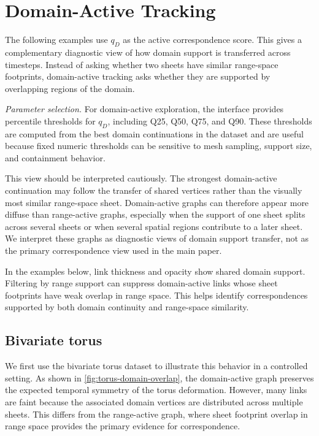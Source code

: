 \documentclass[review]{vgtc}
\begin{document}
\section{Domain-Active Tracking}

The following examples use $q_D$ as the active correspondence score. This gives a complementary diagnostic view of how domain support is transferred across timesteps. Instead of asking whether two sheets have similar range-space footprints, domain-active tracking asks whether they are supported by overlapping regions of the domain.

\emph{Parameter selection.} For domain-active exploration, the interface provides percentile thresholds for $q_D$, including Q25, Q50, Q75, and Q90. These thresholds are computed from the best domain continuations in the dataset and are useful because fixed numeric thresholds can be sensitive to mesh sampling, support size, and containment behavior.

This view should be interpreted cautiously. The strongest domain-active continuation may follow the transfer of shared vertices rather than the visually most similar range-space sheet. Domain-active graphs can therefore appear more diffuse than range-active graphs, especially when the support of one sheet splits across several sheets or when several spatial regions contribute to a later sheet. We interpret these graphs as diagnostic views of domain support transfer, not as the primary correspondence view used in the main paper.

In the examples below, link thickness and opacity show shared domain support. Filtering by range support can suppress domain-active links whose sheet footprints have weak overlap in range space. This helps identify correspondences supported by both domain continuity and range-space similarity.


\subsection{Bivariate torus}

We first use the bivariate torus dataset to illustrate this behavior in a controlled setting. As shown in \autoref{fig:torus-domain-overlap}, the domain-active graph preserves the expected temporal symmetry of the torus deformation. However, many links are faint because the associated domain vertices are distributed across multiple sheets. This differs from the range-active graph, where sheet footprint overlap in range space provides the primary evidence for correspondence.
\end{document}
